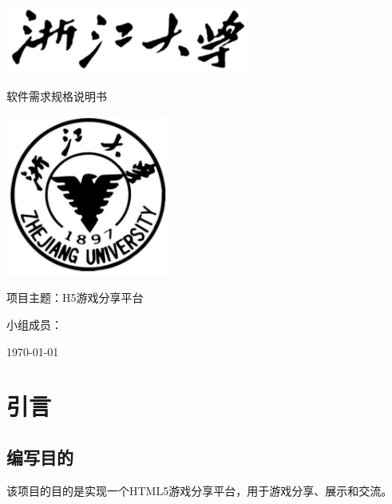 \documentclass[12pt]{ctexart} %
\begin{document}
\begin{titlepage}
  \centering %
  \vspace*{2cm} %
  \includegraphics[width=0.6\textwidth]{zjutitle.jpg} %
  
  \vspace{2cm} %
  
  {\fontsize{36}{48}\selectfont{} 软件需求规格说明书} %
  
  \vspace{2cm} %
  
  \includegraphics[width=0.4\textwidth]{zjulogo.jpg} %
  
  \vspace{2cm}
  
  {\Huge{}  项目主题：H5游戏分享平台} %
  
  \vspace{1cm}

  {\Large{} 小组成员：} %
  
  \vspace{1cm} %
  
  {\Large{} \today} %

\end{titlepage}

\newpage
\tableofcontents %
\newpage

\section{引言}

\subsection{编写目的}
该项目的目的是实现一个HTML5游戏分享平台，用于游戏分享、展示和交流。
\end{document}
